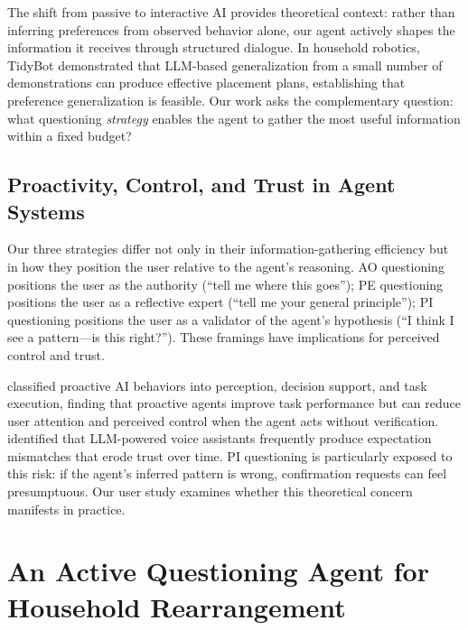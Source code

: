 \documentclass[a4paper,fleqn]{cas-sc}
\begin{document}
The shift from passive to interactive AI \citep{raees2024from} provides theoretical context: rather than inferring preferences from observed behavior alone, our agent actively shapes the information it receives through structured dialogue. In household robotics, TidyBot \citep{wu2023tidybot} demonstrated that LLM-based generalization from a small number of demonstrations can produce effective placement plans, establishing that preference generalization is feasible. Our work asks the complementary question: what questioning \emph{strategy} enables the agent to gather the most useful information within a fixed budget?

\subsection{Proactivity, Control, and Trust in Agent Systems}

Our three strategies differ not only in their information-gathering efficiency but in how they position the user relative to the agent's reasoning. AO questioning positions the user as the authority (``tell me where this goes''); PE questioning positions the user as a reflective expert (``tell me your general principle''); PI questioning positions the user as a validator of the agent's hypothesis (``I think I see a pattern---is this right?''). These framings have implications for perceived control and trust.

\citet{yang2025proactive} classified proactive AI behaviors into perception, decision support, and task execution, finding that proactive agents improve task performance but can reduce user attention and perceived control when the agent acts without verification. \citet{mahmood2025user} identified that LLM-powered voice assistants frequently produce expectation mismatches that erode trust over time. PI questioning is particularly exposed to this risk: if the agent's inferred pattern is wrong, confirmation requests can feel presumptuous. Our user study examines whether this theoretical concern manifests in practice.


\section{An Active Questioning Agent for Household Rearrangement}\label{sec:system}
\end{document}
